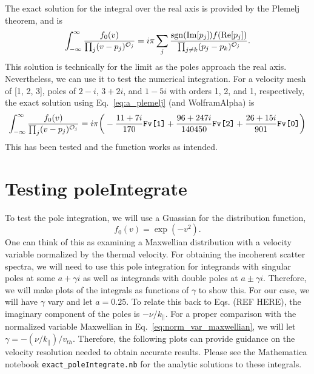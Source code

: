 The exact solution for the integral over the real axis is provided by the Plemelj theorem, %
and is 
\begin{equation}
	\int_{-\infty}^\infty \frac{f_0(v)}{\prod_j (v-p_j)^{\mathcal{O}_j}} = 
	i \pi \sum_j \frac{ \operatorname{sgn}(\operatorname{Im}[p_j]) f(\operatorname{Re}[p_j])}{ \prod_{j\neq k} (p_j - p_k)^{\mathcal{O}_j}}.
	\label{eq:a_plemelj}
\end{equation} 
This solution is technically for the limit as the poles approach the real axis. 
Nevertheless, we can use it to test the numerical integration.
For a velocity mesh of [1, 2, 3], 
poles of $2-i$, $3+2i$, and $1-5i$ with orders 
1, 2, and 1, respectively, the exact solution using Eq.~\ref{eq:a_plemelj} (and WolframAlpha) is
\begin{equation}
	\int_{-\infty}^\infty \frac{f_0(v)}{\prod_j (v-p_j)^{\mathcal{O}_j}} = 
	i \pi \bigg(-\frac{11+7i}{170} \verb|Fv[1]| + \frac{96+247i}{140450} \verb|Fv[2]|  + \frac{26+15i}{901} \verb|Fv[0]|  \bigg) 
\end{equation}
This has been tested and the function works as intended.


\section{Testing poleIntegrate}

To test the pole integration, we will use a Guassian for the distribution function,
\begin{equation}
	f_0(v) = \exp(-v^2). 
	\label{eq:norm_var_maxwellian}
\end{equation}
One can think of this as examining a Maxwellian distribution with a velocity variable normalized by the thermal velocity.
For obtaining the incoherent scatter spectra, we will need to use this pole integration for integrands 
with singular poles at some $a+\gamma i$ as well as integrands with double poles at $a\pm \gamma i$.
Therefore, we will make plots of the integrals as functions of $\gamma$ to show this.
For our case, we will have $\gamma$ vary and let $a=0.25$. 
To relate this back to Eqs. (REF HERE), the imaginary component of the poles is $-\nu/k_\parallel$.
For a proper comparison with the normalized variable Maxwellian in Eq.~\ref{eq:norm_var_maxwellian},
we will let $\gamma = -(\nu/k_\parallel)/v_{th}$. 
Therefore, the following plots can provide guidance on the velocity resolution needed to obtain accurate results.		
Please see the Mathematica notebook \verb*|exact_poleIntegrate.nb| for the analytic solutions to these integrals. %

